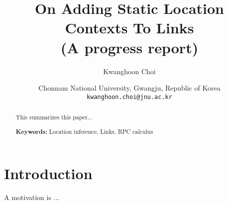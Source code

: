\documentclass[a4paper]{article}
\title{On Adding Static Location Contexts To Links\\(A progress report)}
\author{Kwanghoon Choi}
\date{
  Chonnam National University, Gwangju, Republic of Korea
  \\ \texttt{kwanghoon.choi@jnu.ac.kr}\\[2ex]%
}
\theoremstyle{plain}
\newtheorem{theorem}{Theorem}
\newtheorem{corollary}[theorem]{Corollary}
\theoremstyle{definition}
\begin{document}
\maketitle
	
\begin{abstract}
This summarizes this paper...
		
\noindent\textbf{Keywords:} Location inference, Links, RPC calculus
\end{abstract}

	
\section{Introduction}
\label{sec:intro}

A motivation is ...

	
	
	
	
	

	

\end{document}
